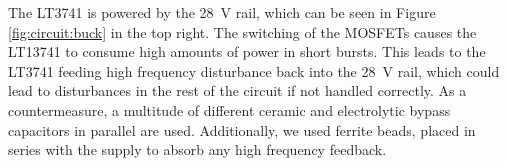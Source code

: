 The LT3741 is powered by the \SI{28}{\volt}  rail, which can be seen in Figure
\ref{fig:circuit:buck} in the  top right. The switching of  the MOSFETs causes
the LT13741  to consume high amounts  of power in short  bursts. This leads to
the LT3741  feeding high  frequency disturbance  back into  the \SI{28}{\volt}
rail, which  could lead  to disturbances  in the  rest of  the circuit  if not
handled correctly.  As a countermeasure,  a multitude of different ceramic and
electrolytic bypass  capacitors in parallel  are used.  Additionally,  we used
ferrite beads, placed  in series with the supply to  absorb any high frequency
feedback.
